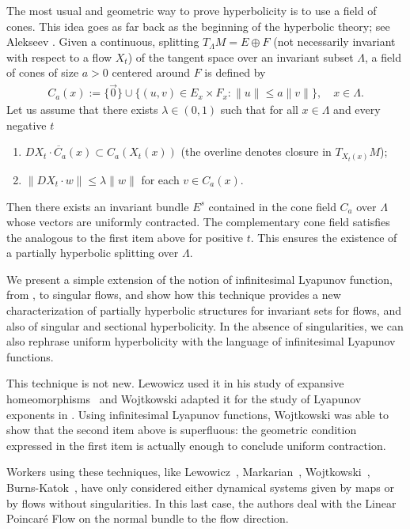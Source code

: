 \documentclass[12pt,reqno]{amsart}
\numberwithin{equation}{section}
\theoremstyle{plain}
\theoremstyle{definition}
\begin{document}
The most usual and geometric way to prove hyperbolicity is
to use a field of cones. This idea goes as far back as the
beginning of the hyperbolic theory; see Alekseev
\cite{Aleks68,Aleks68a,Aleks69}. Given a continuous, 
splitting $T_\Lambda M=E\oplus F$ (not necessarily invariant
with respect to a flow $X_t$) of the tangent space over
an invariant subset $\Lambda$, a field of cones of size $a>0$
centered around $F$ is defined by
\begin{align*}
  C_a(x):=\{\vec0\}\cup\{(u,v)\in E_x\times F_x
  : \| u\| \le a\|v\|\}, \quad x\in\Lambda.
\end{align*}
Let us assume that there exists $\lambda\in(0,1)$ such that for
all $x\in\Lambda$ and every negative $t$
\begin{enumerate}
\item $\overline{DX_t\cdot C_a(x)}\subset C_a(X_t(x))$ (the
  overline denotes closure in $T_{X_t(x)}M$);
\item $\|DX_t\cdot w\| \le \lambda \|w\|$ for each $v\in C_a(x)$.
\end{enumerate}
Then there exists an invariant bundle $E^s$ contained in the
cone field $C_a$ over $\Lambda$ whose vectors are uniformly
contracted. The complementary cone field satisfies the
analogous to the first item above for positive $t$. This
ensures the existence of a partially hyperbolic splitting
over $\Lambda$.

We present a simple extension of the notion of infinitesimal
Lyapunov function, from \cite{BurnKatok94}, to singular
flows, and show how this technique provides a new
characterization of partially hyperbolic structures for
invariant sets for flows, and also of singular and sectional
hyperbolicity. In the absence of singularities, we can also
rephrase uniform hyperbolicity with the language of
infinitesimal Lyapunov functions.

This technique is not new. Lewowicz used it in his study of
expansive homeomorphisms~\cite{lewow89} and Wojtkowski
adapted it for the study of Lyapunov exponents in
\cite{Wojtk85}.  Using infinitesimal Lyapunov functions,
Wojtkowski was able to show that the second item above is
superfluous: the geometric condition expressed in the first
item is actually enough to conclude uniform contraction.

Workers using these techniques, like
Lewowicz~\cite{lewow80}, Markarian~\cite{Mrkr88},
Wojtkowski~\cite{Wojtk00a}, Burns-Katok~\cite{BurnKatok94},
have only considered either dynamical systems given by maps
or by flows without singularities. In this last case, the
authors deal with the Linear Poincar\'e Flow on the normal
bundle to the flow direction.
\end{document}
